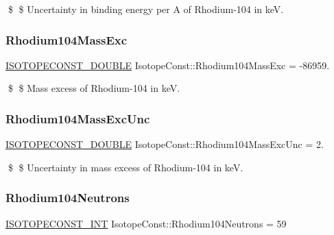 \$ \$ Uncertainty in binding energy per A of Rhodium-\/104 in keV. \mbox{\label{group___isotope_const-_rhodium-_rh104_ga48286e31493f0746e79fa5bacafde710}} 
\subsubsection{\texorpdfstring{Rhodium104\+Mass\+Exc}{Rhodium104MassExc}}
{\footnotesize\ttfamily \mbox{\hyperlink{group___isotope_const-_macros_ga8f45a7272ce02c0b4c65c44636ed719a}{I\+S\+O\+T\+O\+P\+E\+C\+O\+N\+S\+T\+\_\+\+D\+O\+U\+B\+LE}} Isotope\+Const\+::\+Rhodium104\+Mass\+Exc = -\/86959.}

\$ \$ Mass excess of Rhodium-\/104 in keV. \mbox{\label{group___isotope_const-_rhodium-_rh104_ga061cd0aae2f8de4f7e87082013ad1b65}} 
\subsubsection{\texorpdfstring{Rhodium104\+Mass\+Exc\+Unc}{Rhodium104MassExcUnc}}
{\footnotesize\ttfamily \mbox{\hyperlink{group___isotope_const-_macros_ga8f45a7272ce02c0b4c65c44636ed719a}{I\+S\+O\+T\+O\+P\+E\+C\+O\+N\+S\+T\+\_\+\+D\+O\+U\+B\+LE}} Isotope\+Const\+::\+Rhodium104\+Mass\+Exc\+Unc = 2.}

\$ \$ Uncertainty in mass excess of Rhodium-\/104 in keV. \mbox{\label{group___isotope_const-_rhodium-_rh104_gadcc506521177f7b848ed827c8582195e}} 
\subsubsection{\texorpdfstring{Rhodium104\+Neutrons}{Rhodium104Neutrons}}
{\footnotesize\ttfamily \mbox{\hyperlink{group___isotope_const-_macros_ga5f18360b3e99483a35c32d789e62621c}{I\+S\+O\+T\+O\+P\+E\+C\+O\+N\+S\+T\+\_\+\+I\+NT}} Isotope\+Const\+::\+Rhodium104\+Neutrons = 59}

